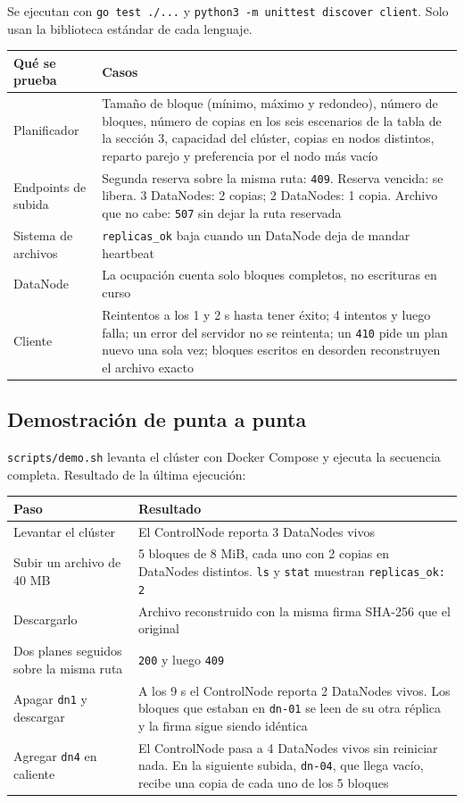 \documentclass[10pt]{article}
\begin{document}
Se ejecutan con \texttt{go test ./...} y \texttt{python3 -m unittest discover client}. Solo usan la biblioteca estándar de cada lenguaje.

\begin{xltabular}{\linewidth}{@{}L{3.4cm}Y@{}}
\toprule
Qué se prueba & Casos \\
\midrule\endhead
Planificador & Tamaño de bloque (mínimo, máximo y redondeo), número de bloques, número de copias en los seis escenarios de la tabla de la sección 3, capacidad del clúster, copias en nodos distintos, reparto parejo y preferencia por el nodo más vacío \\
Endpoints de subida & Segunda reserva sobre la misma ruta: \texttt{409}. Reserva vencida: se libera. 3 DataNodes: 2 copias; 2 DataNodes: 1 copia. Archivo que no cabe: \texttt{507} sin dejar la ruta reservada \\
Sistema de archivos & \texttt{replicas\_ok} baja cuando un DataNode deja de mandar heartbeat \\
DataNode & La ocupación cuenta solo bloques completos, no escrituras en curso \\
Cliente & Reintentos a los 1 y 2 s hasta tener éxito; 4 intentos y luego falla; un error del servidor no se reintenta; un \texttt{410} pide un plan nuevo una sola vez; bloques escritos en desorden reconstruyen el archivo exacto \\
\bottomrule
\end{xltabular}

\subsection{Demostración de punta a punta}

\texttt{scripts/demo.sh} levanta el clúster con Docker Compose y ejecuta la secuencia completa. Resultado de la última ejecución:

\begin{xltabular}{\linewidth}{@{}L{4.6cm}Y@{}}
\toprule
Paso & Resultado \\
\midrule\endhead
Levantar el clúster & El ControlNode reporta 3 DataNodes vivos \\
Subir un archivo de 40 MB & 5 bloques de 8 MiB, cada uno con 2 copias en DataNodes distintos. \texttt{ls} y \texttt{stat} muestran \texttt{replicas\_ok: 2} \\
Descargarlo & Archivo reconstruido con la misma firma SHA-256 que el original \\
Dos planes seguidos sobre la misma ruta & \texttt{200} y luego \texttt{409} \\
Apagar \texttt{dn1} y descargar & A los 9 s el ControlNode reporta 2 DataNodes vivos. Los bloques que estaban en \texttt{dn-01} se leen de su otra réplica y la firma sigue siendo idéntica \\
Agregar \texttt{dn4} en caliente & El ControlNode pasa a 4 DataNodes vivos sin reiniciar nada. En la siguiente subida, \texttt{dn-04}, que llega vacío, recibe una copia de cada uno de los 5 bloques \\
\bottomrule
\end{xltabular}
\end{document}
